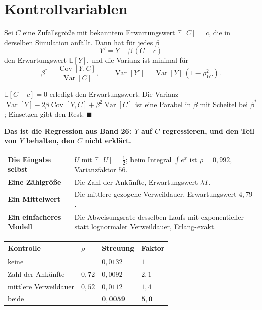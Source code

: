 \section{Kontrollvariablen}

\begin{merksatz}
Sei $C$ eine Zufallsgröße mit bekanntem Erwartungswert $\mathbb E[C] = c$, die in derselben Simulation anfällt. Dann hat für jedes $\beta$
\[ Y' = Y - \beta\,(C - c) \]
den Erwartungswert $\mathbb E[Y]$, und die Varianz ist minimal für
\[ \beta^{*} = \frac{\operatorname{Cov}[Y,C]}{\operatorname{Var}[C]}, \qquad \operatorname{Var}[Y'] = \operatorname{Var}[Y]\,(1-\rho^{2}_{YC}) . \]

$\mathbb E[C-c]=0$ erledigt den Erwartungswert. Die Varianz $\operatorname{Var}[Y] - 2\beta\operatorname{Cov}[Y,C] + \beta^2\operatorname{Var}[C]$ ist eine Parabel in $\beta$ mit Scheitel bei $\beta^*$; Einsetzen gibt den Rest. $\blacksquare$

\begin{center}
\begin{minipage}{0.9\textwidth}
\textbf{Das ist die Regression aus Band 26: $Y$ auf $C$ regressieren, und den Teil von $Y$ behalten, den $C$ nicht erklärt.}
\end{minipage}
\end{center}

\begin{center}
{\small
\renewcommand{\arraystretch}{1.5}
\begin{tabular}{@{}P{3.2cm}P{5.4cm}@{}}
\toprule
\textbf{Die Eingabe selbst} & $U$ mit $\mathbb E[U] = \tfrac12$; beim Integral $\int e^x$ ist $\rho = 0{,}992$, Varianzfaktor $56$.\\
\textbf{Eine Zählgröße} & Die Zahl der Ankünfte, Erwartungswert $\lambda T$.\\
\textbf{Ein Mittelwert} & Die mittlere gezogene Verweildauer, Erwartungswert $4{,}79$.\\
\textbf{Ein einfacheres Modell} & Die Abweisungsrate desselben Laufs mit exponentieller statt lognormaler Verweildauer, Erlang-exakt.\\
\bottomrule
\end{tabular}}
\end{center}

\begin{center}
{\small
\renewcommand{\arraystretch}{1.48}
\begin{tabular}{@{}P{3.4cm}P{1.4cm}P{2.2cm}P{2.2cm}@{}}
\toprule
\textbf{Kontrolle} & $\rho$ & \textbf{Streuung} & \textbf{Faktor}\\
\midrule
keine & & $0{,}0132$ & $1$\\
Zahl der Ankünfte & $0{,}72$ & $0{,}0092$ & $2{,}1$\\
mittlere Verweildauer & $0{,}52$ & $0{,}0112$ & $1{,}4$\\
beide & & $\mathbf{0{,}0059}$ & $\mathbf{5{,}0}$\\
\bottomrule
\end{tabular}}
\end{center}


\end{merksatz}
